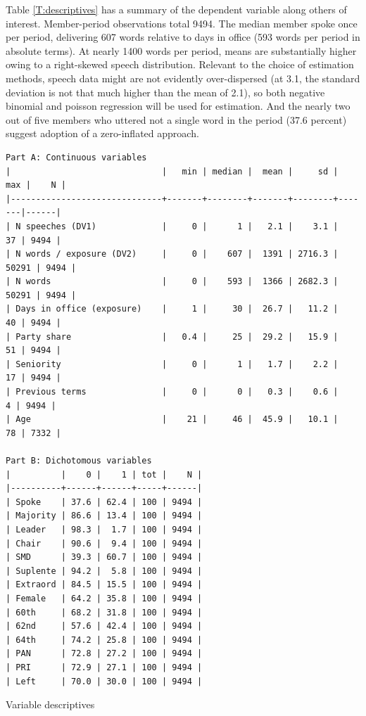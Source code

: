 \documentclass[letter,12pt]{article}
\begin{document}

Table \ref{T:descriptives} has a summary of the dependent variable along others of interest. Member-period observations total 9494. The median member spoke once per period, delivering 607 words relative to days in office (593 words per period in absolute terms). At nearly 1400 words per period, means are substantially higher owing to a right-skewed speech distribution. Relevant to the choice of estimation methods, speech data might are not evidently over-dispersed (at 3.1, the standard deviation is not that much higher than the mean of 2.1), so both negative binomial and poisson regression will be used for estimation. And the nearly two out of five members who uttered not a single word in the period (37.6 percent) suggest adoption of a zero-inflated approach.

\begin{table}
  \begin{scriptsize}
    \begin{verbatim}
Part A: Continuous variables
|                              |   min | median |  mean |     sd |   max |    N |
|------------------------------+-------+--------+-------+--------+-------|------|
| N speeches (DV1)             |     0 |      1 |   2.1 |    3.1 |    37 | 9494 |
| N words / exposure (DV2)     |     0 |    607 |  1391 | 2716.3 | 50291 | 9494 |
| N words                      |     0 |    593 |  1366 | 2682.3 | 50291 | 9494 |
| Days in office (exposure)    |     1 |     30 |  26.7 |   11.2 |    40 | 9494 |
| Party share                  |   0.4 |     25 |  29.2 |   15.9 |    51 | 9494 |
| Seniority                    |     0 |      1 |   1.7 |    2.2 |    17 | 9494 |
| Previous terms               |     0 |      0 |   0.3 |    0.6 |     4 | 9494 |
| Age                          |    21 |     46 |  45.9 |   10.1 |    78 | 7332 |

Part B: Dichotomous variables
|          |    0 |    1 | tot |    N |
|----------+------+------+-----+------|
| Spoke    | 37.6 | 62.4 | 100 | 9494 |
| Majority | 86.6 | 13.4 | 100 | 9494 |
| Leader   | 98.3 |  1.7 | 100 | 9494 |
| Chair    | 90.6 |  9.4 | 100 | 9494 |
| SMD      | 39.3 | 60.7 | 100 | 9494 |
| Suplente | 94.2 |  5.8 | 100 | 9494 |
| Extraord | 84.5 | 15.5 | 100 | 9494 |
| Female   | 64.2 | 35.8 | 100 | 9494 |
| 60th     | 68.2 | 31.8 | 100 | 9494 |
| 62nd     | 57.6 | 42.4 | 100 | 9494 |
| 64th     | 74.2 | 25.8 | 100 | 9494 |
| PAN      | 72.8 | 27.2 | 100 | 9494 |
| PRI      | 72.9 | 27.1 | 100 | 9494 |
| Left     | 70.0 | 30.0 | 100 | 9494 |
    \end{verbatim}
  \end{scriptsize}
\caption{Variable descriptives}\label{T:descriptives}
\end{table}
\end{document}
